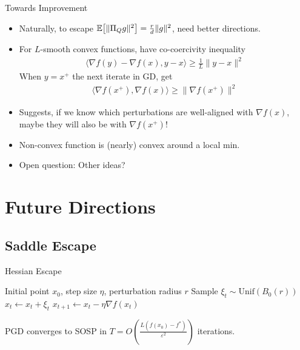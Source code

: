 \documentclass[10pt]{beamer}
\def \ve{\varepsilon}
\newcommand{\mg}[1]{\| #1 \|}
\newcommand{\E}{\mathbb{E}\qty}
\renewcommand{\grad}{\nabla}
\newcommand{\1}{\mathbbm{1}}
\begin{document}
\begin{frame}{Towards Improvement}
    \begin{itemize}
        \item Naturally, to escape $\E[\mg{\Pi_Q g}^2] = \frac{r}{d} \mg{g}^2$, need better directions. 
        \item For $L$-smooth convex functions, have co-coercivity inequality
        \begin{align*}
            \langle \grad f(y) - \grad f(x), y-x \rangle \geq \frac{1}{L} \mg{y-x}^2
        \end{align*}
        When $y = x^+$ the next iterate in GD, get
        \begin{align*}
            \langle \grad f(x^+), \grad f(x) \rangle \geq \mg{\grad f(x^+)}^2
        \end{align*}
        \item Suggests, if we know which perturbations are well-aligned with $\grad f(x)$, maybe they will also be with $\grad f(x^+)$!
        \item Non-convex function is (nearly) convex around a local min.
        \item \alert{Open question: Other ideas?}
    \end{itemize}
\end{frame}

\section{Future Directions}
\subsection{Saddle Escape}
\begin{frame}{Hessian Escape}
\begin{algorithm}[H]
\caption{Perturbed Gradient Descent}
\begin{algorithmic}[1]
\Require Initial point $x_0$, step size $\eta$, perturbation radius $r$
        \State Sample $\xi_t \sim \mathrm{Unif}(B_0(r))$
        \State $x_t \gets x_t+\xi_t$
    \EndIf
    \State $x_{t+1}\gets x_t-\eta\nabla f(x_t)$
\EndFor
\end{algorithmic}
\end{algorithm}
\begin{theorem}
    PGD converges to SOSP in $T = O\left(\frac{L (f(x_0)-f^*)}{\ve^2}\right)$ iterations.
\end{theorem}
\end{frame}
\end{document}
